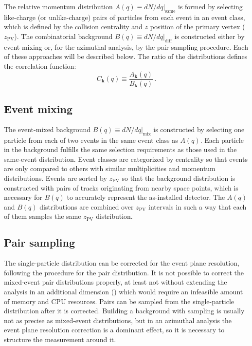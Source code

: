 The relative momentum distribution $A(q) \equiv \left. dN/dq \right|_{\textrm{same}}$ is formed by selecting like-charge (or unlike-charge) pairs of particles from each event in an event class, which is defined by the collision centrality and $z$ position of the primary vertex ($z_\textrm{PV}$).
The combinatorial background $B(q) \equiv \left. dN/dq \right|_{\textrm{diff}}$ is constructed either by event mixing or, for the azimuthal analysis, by the pair sampling procedure.
Each of these approaches will be described below.
The ratio of the distributions defines the correlation function:
\begin{equation}
C_{\mathbf{k}}(q) \equiv \frac{A_{\mathbf{k}}(q)}{B_{\mathbf{k}}(q)} \label{eq:same_over_mixed} \,.
\end{equation}

\subsection{Event mixing}
\label{subsec:evt_mixing}
The event-mixed background $B(q) \equiv \left. dN/dq \right|_{\textrm{mix}}$ is constructed by selecting one particle from each of two events in the same event class as $A(q)$.
Each particle in the background fulfills the same selection requirements as those used in the same-event distribution.
Event classes are categorized by centrality so that events are only compared to others with similar multiplicities and momentum distributions.
Events are sorted by $z_\textrm{PV}$ so that the background distribution is constructed with pairs of tracks originating from nearby space points, which is necessary for $B(q)$ to accurately represent the as-installed detector.
The $A(q)$ and $B(q)$ distributions are combined over $z_\textrm{PV}$ intervals in such a way that each of them samples the same $z_\textrm{PV}$ distribution.


\subsection{Pair sampling}
\label{subsec:bkgd_sampling}
The single-particle distribution can be corrected for the event plane resolution, following the procedure for the pair distribution. It is not possible to correct the mixed-event pair distributions properly, at least not without extending the analysis in an additional dimension (\psit) which would require an infeasible amount of memory and CPU resources. Pairs can be sampled from the single-particle distribution after it is corrected. Building a background with sampling is usually not as precise as mixed-event distributions, but in an azimuthal analysis the event plane resolution correction is a dominant effect, so it is necessary to structure the measurement around it.

